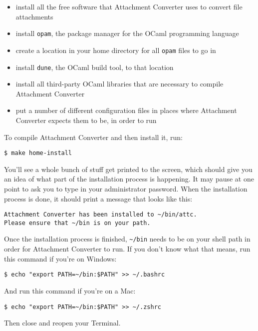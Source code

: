 \documentclass[11pt]{article}
\begin{document}
\begin{itemize}
\item install all the free software that Attachment Converter uses to
convert file attachments
\item install \texttt{opam}, the package manager for the OCaml programming language
\item create a location in your home directory for all \texttt{opam} files to go in
\item install \texttt{dune}, the OCaml build tool, to that location
\item install all third-party OCaml libraries that are necessary to
compile Attachment Converter
\item put a number of different configuration files in places where
Attachment Converter expects them to be, in order to run
\end{itemize}

To compile Attachment Converter and then install it, run:

\begin{verbatim}
$ make home-install
\end{verbatim}

You'll see a whole bunch of stuff get printed to the screen, which
should give you an idea of what part of the installation process is
happening.  It may pause at one point to ask you to type in your
administrator password.  When the installation process is done, it
should print a message that looks like this:

\begin{verbatim}
Attachment Converter has been installed to ~/bin/attc.
Please ensure that ~/bin is on your path.
\end{verbatim}

Once the installation process is finished, \texttt{\textasciitilde{}/bin} needs to be on your
shell path in order for Attachment Converter to run.  If you don't
know what that means, run this command if you're on Windows:

\begin{verbatim}
$ echo "export PATH=~/bin:$PATH" >> ~/.bashrc
\end{verbatim}

And run this command if you're on a Mac:

\begin{verbatim}
$ echo "export PATH=~/bin:$PATH" >> ~/.zshrc
\end{verbatim}

Then close and reopen your Terminal.
\end{document}

